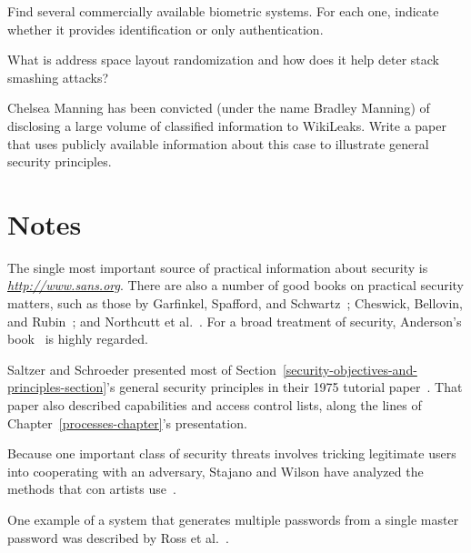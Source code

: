 \begin{chapterEnumerate}
\item
Find several commercially available biometric systems.  For each one, indicate whether it provides identification or only authentication.

\item
What is address space layout randomization and how does it help deter stack smashing attacks?

\item
Chelsea Manning has been convicted (under the name Bradley Manning) of disclosing a large volume of classified information to WikiLeaks. Write a paper that uses
publicly available information about this case to illustrate general security principles.

\end{chapterEnumerate}

\section*{Notes}

The single most important source of practical information about
security is \textit{\url{http://www.sans.org}}.  There
are also a number of good books on practical security matters, such as
those by Garfinkel, Spafford, and Schwartz~\cite{max1166}; Cheswick,
Bellovin, and Rubin~\cite{max1165}; and Northcutt et
  al.~\cite{max1167}.  For a broad treatment of security,
Anderson's book~\cite{max1195} is highly regarded.

Saltzer and Schroeder presented most of Section~\ref{security-objectives-and-principles-section}'s general security
principles in their 1975 tutorial paper~\cite{max1164}.  That
paper also described capabilities and access control lists, along the
lines of Chapter~\ref{processes-chapter}'s presentation.

Because one important class of security threats involves tricking legitimate users
into cooperating with an adversary, Stajano and Wilson have analyzed the methods
that con artists use~\cite{max1196,max1197}.

One example of a system that generates multiple passwords from a
single master password was described by Ross et al.~\cite{max1178}.

